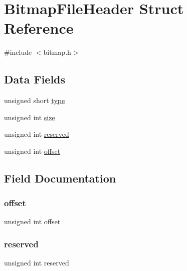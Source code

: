 \hypertarget{struct_bitmap_file_header}{}\section{Bitmap\+File\+Header Struct Reference}
\label{struct_bitmap_file_header}


{\ttfamily \#include $<$bitmap.\+h$>$}

\subsection*{Data Fields}
\begin{DoxyCompactItemize}
\item 
unsigned short \hyperlink{struct_bitmap_file_header_aa929142c5ddf34cf0915c97a617a1a63}{type}
\item 
unsigned int \hyperlink{struct_bitmap_file_header_aac913b3a1f6ef005d66bf7a84428773e}{size}
\item 
unsigned int \hyperlink{struct_bitmap_file_header_a05d5cbcb44f437341bd9fa37d589aced}{reserved}
\item 
unsigned int \hyperlink{struct_bitmap_file_header_a29b5297d3393519050e3126c4cb07c1c}{offset}
\end{DoxyCompactItemize}


\subsection{Field Documentation}
\mbox{\label{struct_bitmap_file_header_a29b5297d3393519050e3126c4cb07c1c}} 
\subsubsection{\texorpdfstring{offset}{offset}}
{\footnotesize\ttfamily unsigned int offset}

\mbox{\label{struct_bitmap_file_header_a05d5cbcb44f437341bd9fa37d589aced}} 
\subsubsection{\texorpdfstring{reserved}{reserved}}
{\footnotesize\ttfamily unsigned int reserved}

